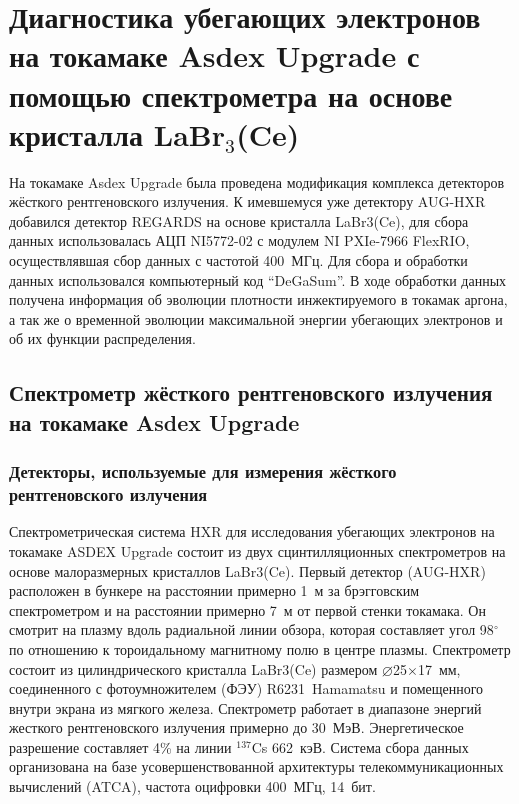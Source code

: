 \chapter{Диагностика убегающих электронов на токамаке Asdex Upgrade с помощью спектрометра на основе кристалла LaBr${}_3$(Ce)}
\label{sec:jet}

На токамаке Asdex Upgrade была проведена модификация комплекса детекторов жёсткого рентгеновского излучения. К имевшемуся уже детектору AUG-HXR добавился детектор REGARDS на основе кристалла LaBr3(Ce), для сбора данных использовалась АЦП NI5772-02 с модулем NI PXIe-7966 FlexRIO, осуществлявшая сбор данных с частотой 400~МГц. Для сбора и обработки данных использовался компьютерный код ``DeGaSum''.  В ходе обработки данных получена информация об эволюции плотности инжектируемого в токамак аргона, а так же о временной эволюции максимальной энергии убегающих электронов и об их функции распределения.


\section{Спектрометр жёсткого рентгеновского излучения на токамаке Asdex Upgrade}

\subsection{Детекторы, используемые для измерения жёсткого рентгеновского излучения}

Спектрометрическая система HXR для исследования убегающих электронов на токамаке ASDEX Upgrade состоит из двух сцинтилляционных спектрометров на основе малоразмерных кристаллов LaBr3(Ce). Первый детектор (AUG-HXR) расположен в бункере на расстоянии примерно 1~м за брэгговским спектрометром и на расстоянии примерно 7~м от первой стенки токамака. Он смотрит на плазму вдоль радиальной линии обзора, которая составляет угол 98${}^{\circ}$ по отношению к тороидальному магнитному полю в центре плазмы. Спектрометр состоит из цилиндрического кристалла LaBr3(Ce) размером $\varnothing$25$\times$17~мм, соединенного с фотоумножителем (ФЭУ) R6231~Hamamatsu и помещенного внутри экрана из мягкого железа. Спектрометр работает в  диапазоне энергий жесткого рентгеновского излучения примерно до 30~МэВ. Энергетическое разрешение составляет 4\% на линии ${}^{137}$Cs 662~кэВ. Система сбора данных организована на базе усовершенствованной архитектуры телекоммуникационных вычислений (ATCA), частота оцифровки 400~МГц, 14~бит.~\cite{Shevelev2021,Nocente2018} 

